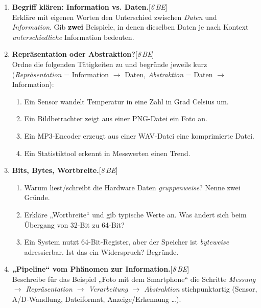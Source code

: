 \documentclass[11pt,a4paper]{scrartcl}
\newenvironment{aufgaben}{%
	\begin{enumerate}[leftmargin=*,label=\textbf{Aufgabe~\arabic*:}, itemsep=0.6em]
	}{\end{enumerate}}
\newcommand{\punkte}[1]{\hfill{\small[\textit{#1\,BE}]}}
\begin{document}
	\begin{aufgaben}
		
		\item \textbf{Begriff klären: Information vs. Daten.}\punkte{6}\\
		Erkläre mit eigenen Worten den Unterschied zwischen \emph{Daten} und \emph{Information}.
		Gib \textbf{zwei} Beispiele, in denen dieselben Daten je nach Kontext \emph{unterschiedliche} Information bedeuten.
		
		\item \textbf{Repräsentation oder Abstraktion?}\punkte{8}\\
		Ordne die folgenden Tätigkeiten zu und begründe jeweils kurz (\emph{Repräsentation} = Information $\to$ Daten, \emph{Abstraktion} = Daten $\to$ Information):
		\begin{enumerate}[label*=\alph*)]
			\item Ein Sensor wandelt Temperatur in eine Zahl in Grad Celsius um.\\
			\item Ein Bildbetrachter zeigt aus einer PNG-Datei ein Foto an.\\
			\item Ein MP3-Encoder erzeugt aus einer WAV-Datei eine komprimierte Datei.\\
			\item Ein Statistiktool erkennt in Messwerten einen Trend.
		\end{enumerate}
		
		\item \textbf{Bits, Bytes, Wortbreite.}\punkte{8}\\
		\begin{enumerate}[label*=\alph*)]
			\item Warum liest/schreibt die Hardware Daten \emph{gruppenweise}? Nenne zwei Gründe.\\
			\item Erkläre „Wortbreite“ und gib typische Werte an. Was ändert sich beim Übergang von 32-Bit zu 64-Bit?\\
			\item Ein System nutzt 64-Bit-Register, aber der Speicher ist \emph{byteweise} adressierbar. Ist das ein Widerspruch? Begründe.
		\end{enumerate}
		
		\item \textbf{„Pipeline“ vom Phänomen zur Information.}\punkte{8}\\
		Beschreibe für das Beispiel „Foto mit dem Smartphone“ die Schritte \emph{Messung $\to$ Repräsentation $\to$ Verarbeitung $\to$ Abstraktion} stichpunktartig (Sensor, A/D-Wandlung, Dateiformat, Anzeige/Erkennung \dots).
		

\end{aufgaben}
\end{document}
